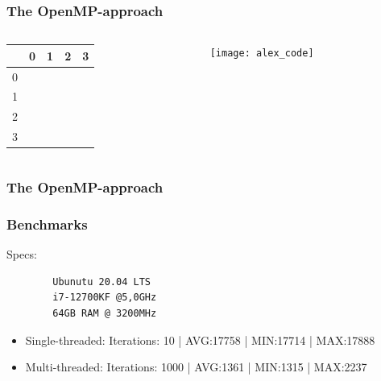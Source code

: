 \begin{frame}
	\frametitle{The OpenMP-approach}

	\begin{columns}
		\begin{column}{0.2\textwidth}
			\Large
	\hspace{2cm}
	\begin{table}[width = 1.2\linewidth]
		\begin{tabular}{l|llll}
			& 0 & 1 & 2 & 3 \\
			\hline
			0 & \color{green}{0}  & \color{green}{1}  & \color{green}{2}  &  \color{green}{3}  \\
			1 &	\color{green}{4}  & \color{green}{5}  &  \color{green}{6} &   \color{green}{7} \\
			2 & \color{green}{8}  & \color{green}{9}  &   \color{red}{9} &   \color{red}{8}	\\
			3 &	  &   &   &    \color{red}{4} \\
		\end{tabular}
	\end{table}

		\end{column}
	
	\begin{column}{0.78\textwidth}
		\vspace{-0.3cm}
		\begin{figure}
			\centering
			\texttt{[image: alex\_code]}
			\label{fig:alexcode}
		\end{figure}
		
	\end{column}
	
	\end{columns}


\end{frame}

\begin{frame}
	\frametitle{The OpenMP-approach}
	

	
\end{frame}

\begin{frame}[fragile]
	\frametitle{Benchmarks}
	\Large
	Specs:
	\begin{lstlisting}
		Ubunutu 20.04 LTS
		i7-12700KF @5,0GHz
		64GB RAM @ 3200MHz
	\end{lstlisting}
	
	\Large
	\begin{itemize}
		\item Single-threaded: Iterations: 10 | AVG:17758 | MIN:17714 | MAX:17888
		\item Multi-threaded: Iterations: 1000 | AVG:1361 | MIN:1315 | MAX:2237
		
	\end{itemize}
	
	
\end{frame}


